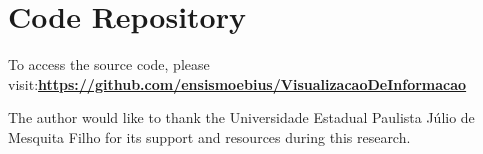 \documentclass[format=sigconf]{acmart}
\begin{document}
	\section{Code Repository}
		\par To access the source code, please visit:\newline \href{https://github.com/ensismoebius/VisualizacaoDeInformacao}{\textbf{https://github.com/ensismoebius/VisualizacaoDeInformacao}}
	
	\begin{acks}
		The author would like to thank the Universidade Estadual Paulista Júlio de Mesquita Filho for its support and resources during this research.
	\end{acks}
	
	
	
	
\end{document}
